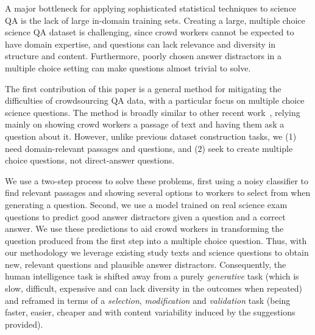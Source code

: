 A major bottleneck for applying sophisticated statistical techniques to science QA is the lack of large in-domain training sets.  Creating a large, multiple choice science QA dataset is challenging, since crowd workers cannot be expected to have domain expertise, and questions can lack relevance and diversity in structure and content. Furthermore, poorly chosen answer distractors in a multiple choice setting can make questions almost trivial to solve.

The first contribution of this paper is a general method for mitigating the difficulties of crowdsourcing QA data, with a particular focus on multiple choice science questions. The method is broadly similar to other recent work~\cite{rajpurkar2016SQUAD}, relying mainly on showing crowd workers a passage of text and having them ask a question about it. However, unlike previous dataset construction tasks, we (1) need domain-relevant passages and questions, and (2) seek to create multiple choice questions, not direct-answer questions. 

We use a two-step process to solve these problems, first using a noisy classifier to find relevant passages and showing several options to workers to select from when generating a question.  Second, we use a model trained on real science exam questions to predict good answer distractors given a question and a correct answer. We use these predictions to aid crowd workers in transforming the question produced from the first step into a multiple choice question. Thus, with our methodology we leverage existing study texts and science questions to obtain new, relevant questions and plausible answer distractors. Consequently, the human intelligence task is shifted away from a purely \emph{generative} task (which is slow, difficult, expensive and can lack diversity in the outcomes when repeated) and reframed in terms of a \emph{selection}, \emph{modification} and \emph{validation} task (being faster, easier, cheaper and with content variability induced by the suggestions provided). 

